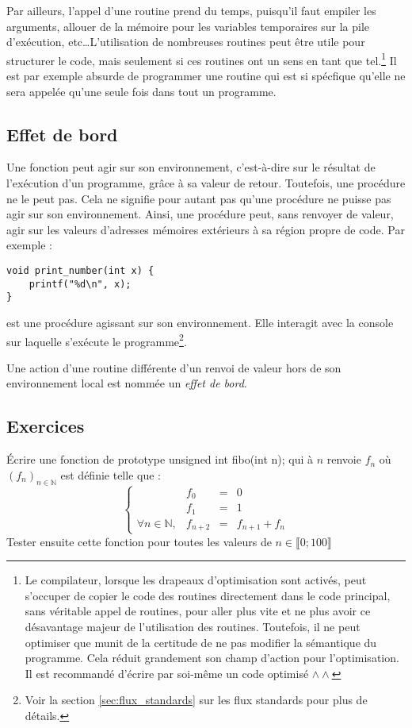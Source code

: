 \documentclass[../../../main.tex]{subfiles}
\begin{document}
Par ailleurs, l'appel d'une routine prend du temps, puisqu'il faut empiler les arguments, allouer de la mémoire pour les variables temporaires sur la pile d'exécution, etc\dots L'utilisation de nombreuses routines peut être utile pour structurer le code, mais seulement si ces routines ont un sens en tant que tel.\footnote{Le compilateur, lorsque les drapeaux d'optimisation sont activés, peut s'occuper de copier le code des routines directement dans le code principal, sans véritable appel de routines, pour aller plus vite et ne plus avoir ce désavantage majeur de l'utilisation des routines. Toutefois, il ne peut optimiser que munit de la certitude de ne pas modifier la sémantique du programme. Cela réduit grandement son champ d'action pour l'optimisation. Il est recommandé d'écrire par soi-même un code optimisé $\wedge\wedge$} Il est par exemple absurde de programmer une routine qui est si spécfique qu'elle ne sera appelée qu'une seule fois dans tout un programme.
\subsection{Effet de bord}
\label{sub:effet_de_bord}
Une fonction peut agir sur son environnement, c'est-à-dire sur le résultat de l'exécution d'un programme, grâce à sa valeur de retour. Toutefois, une procédure ne le peut pas. Cela ne signifie pour autant pas qu'une procédure ne puisse pas agir sur son environnement. Ainsi, une procédure peut, sans renvoyer de valeur, agir sur les valeurs d'adresses mémoires extérieurs à sa région propre de code. Par exemple :
\begin{verbatim}
void print_number(int x) {
	printf("%d\n", x);
}
\end{verbatim}
est une procédure agissant sur son environnement. Elle interagit avec la console sur laquelle s'exécute le programme\footnote{Voir la section \ref{sec:flux_standards} sur les flux standards pour plus de détails.}.

Une action d'une routine différente d'un renvoi de valeur hors de son environnement local est nommée un \textit{effet de bord}.
\subsection{Exercices}
\newline Écrire une fonction de prototype \textsf{unsigned int fibo(int n);} qui à $n$ renvoie $f_{n}$ où $(f_{n})_{n\in{\mathbb{N}}}$ est définie telle que :
 $$
\left\{\begin{array}{llcl}
& f_{0} & = & 0 \\
& f_{1} & = & 1 \\
\forall{n\in{\mathbb{N}}}, & f_{n+2} & = & f_{n+1} + f_{n}
\end{array}\right.
$$
Tester ensuite cette fonction pour toutes les valeurs de $n\in{\llbracket 0; 100\rrbracket}$
 
\end{document}
